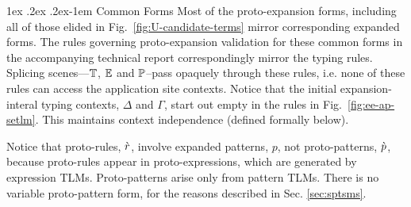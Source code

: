 \documentclass[acmsmall,screen]{acmart}
\makeatletter
\renewcommand{\paragraph}{%
  \@startsection{paragraph}{4}%
  {\z@}{1ex \@plus .2ex \@minus .2ex}{-1em}%
  {\normalfont\normalsize\bfseries}%
}
\makeatother
\begin{document}
\paragraph{Common Forms} Most of the proto-expansion forms, including all of those elided in Fig.~\ref{fig:U-candidate-terms} mirror corresponding expanded forms. The rules governing proto-expansion validation for these common forms  in the accompanying technical report correspondingly mirror the typing rules. Splicing scenes---$\mathbb{T}$, $\mathbb{E}$ and $\mathbb{P}$--pass opaquely through these rules, i.e. none of these rules can access the application site contexts. Notice that the initial expansion-interal typing contexts, $\Delta$ and $\Gamma$, start out empty in the rules in Fig.~\ref{fig:ee-ap-setlm}. This maintains context independence (defined formally below).

Notice that proto-rules, $\grave{r}$, involve expanded patterns, $p$, not proto-patterns, $\grave{p}$, because proto-rules appear in proto-expressions, which are generated by expression TLMs. Proto-patterns arise only from pattern TLMs. There is no variable proto-pattern form, for the reasons described in Sec. \ref{sec:sptsms}.
\end{document}
